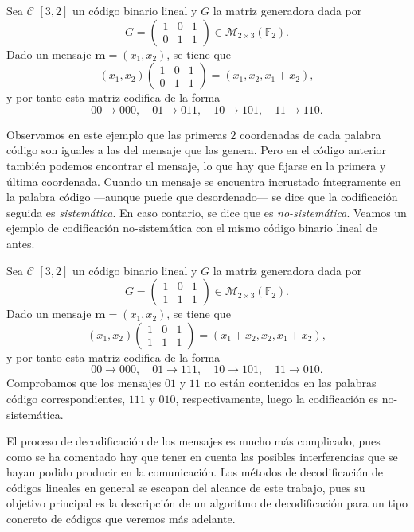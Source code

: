\begin{example}
  Sea \(\mathcal C\) \([3, 2]\) un código binario lineal y \(G\) la matriz generadora dada por 
  \[
    G = \begin{pmatrix}
      1 & 0 & 1 \\ 0 & 1 & 1
    \end{pmatrix} \in \mathcal M_{2 \times 3}(\mathbb F_2).
  \]
  Dado un mensaje \(\mathbf{m} = (x_1, x_2)\), se tiene que \[(x_1, x_2) \begin{pmatrix}
    1 & 0 & 1 \\ 0 & 1 & 1
  \end{pmatrix} = (x_1, x_2, x_1 + x_2),\] y por tanto esta matriz codifica de la forma \[00 \to 000, \quad 01 \to 011,\quad 10 \to 101,\quad 11 \to 110.\]
\end{example}

Observamos en este ejemplo que las primeras \(2\) coordenadas de cada palabra código son iguales a las del mensaje que las genera.
Pero en el código anterior también podemos encontrar el mensaje, lo que hay que fijarse en la primera y última coordenada.
Cuando un mensaje se encuentra incrustado íntegramente en la palabra código —aunque puede que desordenado— se dice que la codificación seguida es \textit{sistemática}.
En caso contario, se dice que es \textit{no-sistemática}.
Veamos un ejemplo de codificación no-sistemática con el mismo código binario lineal de antes.

\begin{example}
  Sea \(\mathcal C\) \([3, 2]\) un código binario lineal y \(G\) la matriz generadora dada por 
  \[
    G = \begin{pmatrix}
      1 & 0 & 1 \\ 1 & 1 & 1
    \end{pmatrix} \in \mathcal M_{2 \times 3}(\mathbb F_2).
  \]
  Dado un mensaje \(\mathbf{m} = (x_1, x_2)\), se tiene que \[(x_1, x_2) \begin{pmatrix}
    1 & 0 & 1 \\ 1 & 1 & 1
  \end{pmatrix} = (x_1 + x_2, x_2, x_1 + x_2),\] y por tanto esta matriz codifica de la forma \[00 \to 000, \quad 01 \to 111,\quad 10 \to 101,\quad 11 \to 010.\]
  Comprobamos que los mensajes \(01\) y \(11\) no están contenidos en las palabras código correspondientes, \(111\) y \(010\), respectivamente, luego la codificación es no-sistemática.
\end{example}

El proceso de decodificación de los mensajes es mucho más complicado, pues como se ha comentado hay que tener en cuenta las posibles interferencias que se hayan podido producir en la comunicación.
Los métodos de decodificación de códigos lineales en general se escapan del alcance de este trabajo, pues su objetivo principal es la descripción de un algoritmo de decodificación para un tipo concreto de códigos que veremos más adelante.

